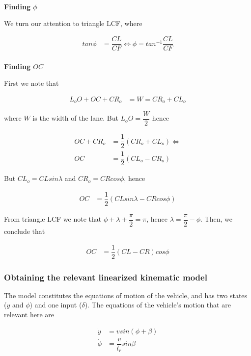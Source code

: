 \documentclass[oneside,12pt]{article}
\begin{document}
    \textbf{Finding $\phi$}

    We turn our attention to triangle LCF, where

    \begin{align}
      tan\phi &= \dfrac{CL}{CF} \Leftrightarrow \phi = tan^{-1} \dfrac{CL}{CF} \\
    \end{align}


    \textbf{Finding $OC$}

    First we note that

    \begin{align}
      L_o O + OC + CR_o &= W = CR_o + CL_o
    \end{align}

    where $W$ is the width of the lane. But $L_o O = \dfrac{W}{2}$ hence

    \begin{align}
      OC + CR_o &= \dfrac{1}{2}(CR_o + CL_o) \Leftrightarrow \\
      OC &= \dfrac{1}{2}(CL_o - CR_o)
    \end{align}

    But $CL_o = CL sin\lambda$ and $CR_o = CR cos\phi$, hence


    \begin{align}
      OC &= \dfrac{1}{2}(CL sin\lambda - CR cos\phi)
    \end{align}

    From triangle LCF we note that $\phi + \lambda + \dfrac{\pi}{2} = \pi$,
    hence $\lambda = \dfrac{\pi}{2} - \phi$. Then, we conclude that

    \begin{align}
      OC &= \dfrac{1}{2}(CL - CR) cos\phi
    \end{align}




    \subsubsection{Obtaining the relevant linearized kinematic model}

    The model constitutes the equations of motion of the vehicle, and has two
    states ($y$ and $\phi$) and one input ($\delta$). The equations of the
    vehicle's motion that are relevant here are

    \begin{align}
      \dot{y} &= v sin(\phi + \beta) \\
      \dot{\phi} &= \dfrac{v}{l_r} sin\beta
    \end{align}
\end{document}
